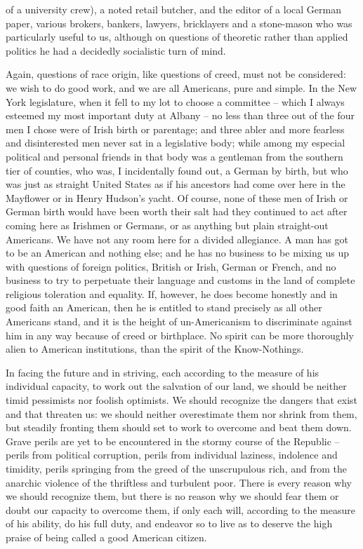 \documentclass[a4paper]{amsbook}
\begin{document}
of a university crew), a noted retail butcher, and the editor of a local German paper, various brokers, bankers, lawyers, bricklayers and a stone-mason who was particularly useful to us, although on questions of theoretic rather than applied politics he had a decidedly socialistic turn of mind.

Again, questions of race origin, like questions of creed, must not be considered: we wish to do good work, and we are all Americans, pure and simple. In the New York legislature, when it fell to my lot to choose a committee – which I always esteemed my most important duty at Albany – no less than three out of the four men I chose were of Irish birth or parentage; and three abler and more fearless and disinterested men never sat in a legislative body; while among my especial political and personal friends in that body was a gentleman from the southern tier of counties, who was, I incidentally found out, a German by birth, but who was just as straight United States as if his ancestors had come over here in the Mayflower or in Henry Hudson's yacht. Of course, none of these men of Irish or German birth would have been worth their salt had they continued to act after coming here as Irishmen or Germans, or as anything but plain straight-out Americans. We have not any room here for a divided allegiance. A man has got to be an American and nothing else; and he has no business to be mixing us up with questions of foreign politics, British or Irish, German or French, and no business to try to perpetuate their language and customs in the land of complete religious toleration and equality. If, however, he does become honestly and in good faith an American, then he is entitled to stand precisely as all other Americans stand, and it is the height of un-Americanism to discriminate against him in any way because of creed or birthplace. No spirit can be more thoroughly alien to American institutions, than the spirit of the Know-Nothings.

In facing the future and in striving, each according to the measure of his individual capacity, to work out the salvation of our land, we should be neither timid pessimists nor foolish optimists. We should recognize the dangers that exist and that threaten us: we should neither overestimate them nor shrink from them, but steadily fronting them should set to work to overcome and beat them down. Grave perils are yet to be encountered in the stormy course of the Republic – perils from political corruption, perils from individual laziness, indolence and timidity, perils springing from the greed of the unscrupulous rich, and from the anarchic violence of the thriftless and turbulent poor. There is every reason why we should recognize them, but there is no reason why we should fear them or doubt our capacity to overcome them, if only each will, according to the measure of his ability, do his full duty, and endeavor so to live as to deserve the high praise of being called a good American citizen.
\end{document}
